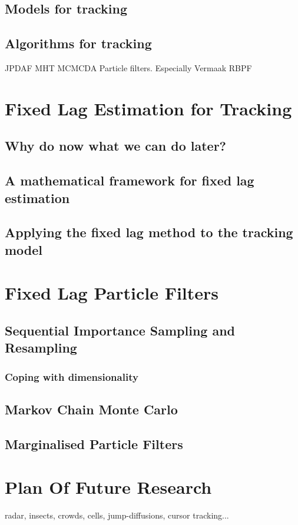 \documentclass{RJWThesis}
\begin{document}
\section{Models for tracking}


\section{Algorithms for tracking}
JPDAF
MHT
MCMCDA
Particle filters. Especially Vermaak
RBPF




\chapter{Fixed Lag Estimation for Tracking}
\section{Why do now what we can do later?}


\section{A mathematical framework for fixed lag estimation}


\section{Applying the fixed lag method to the tracking model}





\chapter{Fixed Lag Particle Filters}
\section{Sequential Importance Sampling and Resampling}
\subsection{Coping with dimensionality}
\section{Markov Chain Monte Carlo}
\section{Marginalised Particle Filters}




\chapter{Plan Of Future Research}
radar, insects, crowds, cells, jump-diffusions, cursor tracking...






\end{document}

